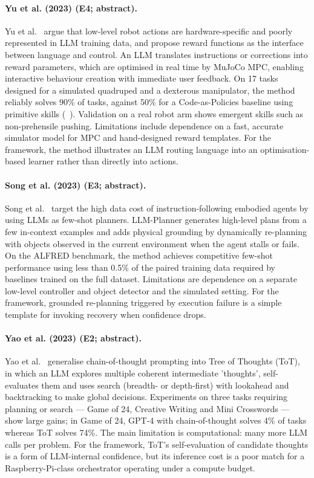 \documentclass[10pt,a4paper]{article}
\begin{document}
\paragraph{Yu et al. (2023) (E4; abstract).} Yu et al.~\cite{Yu2023} argue that low-level robot actions are hardware-specific and poorly represented in LLM training data, and propose reward functions as the interface between language and control. An LLM translates instructions or corrections into reward parameters, which are optimised in real time by MuJoCo MPC, enabling interactive behaviour creation with immediate user feedback. On 17 tasks designed for a simulated quadruped and a dexterous manipulator, the method reliably solves 90\% of tasks, against 50\% for a Code-as-Policies baseline using primitive skills (~\cite{Liang2023}). Validation on a real robot arm shows emergent skills such as non-prehensile pushing. Limitations include dependence on a fast, accurate simulator model for MPC and hand-designed reward templates. For the framework, the method illustrates an LLM routing language into an optimisation-based learner rather than directly into actions.

\paragraph{Song et al. (2023) (E3; abstract).} Song et al.~\cite{Song2023} target the high data cost of instruction-following embodied agents by using LLMs as few-shot planners. LLM-Planner generates high-level plans from a few in-context examples and adds physical grounding by dynamically re-planning with objects observed in the current environment when the agent stalls or fails. On the ALFRED benchmark, the method achieves competitive few-shot performance using less than 0.5\% of the paired training data required by baselines trained on the full dataset. Limitations are dependence on a separate low-level controller and object detector and the simulated setting. For the framework, grounded re-planning triggered by execution failure is a simple template for invoking recovery when confidence drops.

\paragraph{Yao et al. (2023) (E2; abstract).} Yao et al.~\cite{Yao2023b} generalise chain-of-thought prompting into Tree of Thoughts (ToT), in which an LLM explores multiple coherent intermediate 'thoughts', self-evaluates them and uses search (breadth- or depth-first) with lookahead and backtracking to make global decisions. Experiments on three tasks requiring planning or search --- Game of 24, Creative Writing and Mini Crosswords --- show large gains; in Game of 24, GPT-4 with chain-of-thought solves 4\% of tasks whereas ToT solves 74\%. The main limitation is computational: many more LLM calls per problem. For the framework, ToT's self-evaluation of candidate thoughts is a form of LLM-internal confidence, but its inference cost is a poor match for a Raspberry-Pi-class orchestrator operating under a compute budget.
\end{document}
